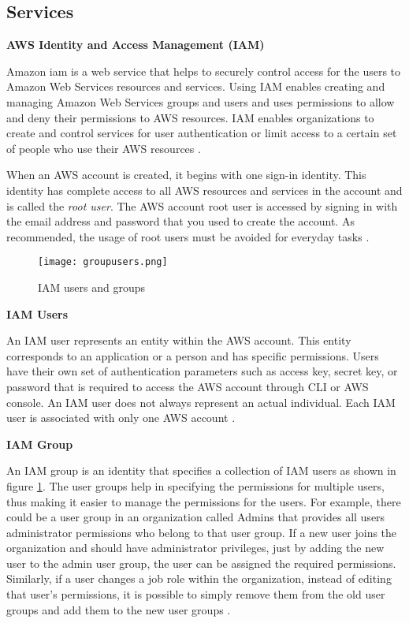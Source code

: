 \subsection{Services}

\textbf{AWS Identity and Access Management (IAM)}

\par Amazon \gls{iam} is a web service that helps to
securely
control access for the users to Amazon Web Services resources and services.
Using IAM enables creating and managing Amazon Web Services groups and users and uses permissions to allow and deny their permissions to AWS resources.
IAM enables organizations to create and control services
for user authentication or limit access to a certain set of people who use their AWS resources \cite{24}.


\par When an AWS account is created, it begins with one
sign-in identity.
This identity has
complete access to all AWS resources and services in the account and is called the \textit{root user}.
The AWS account root
user is accessed by signing in with the email address and password that you used to create the account.
As
recommended, the usage of root users must be avoided for
everyday tasks \cite{25}.


\begin{figure}
    \centering
    \texttt{[image: groupusers.png]}
    \caption{IAM users and groups}{\cite{26}}
    \label{fig:groupusers}
\end{figure}

\textbf{IAM Users}

\par An IAM user represents an entity within the AWS account.
This entity corresponds to an application or a person and has specific permissions.
Users have their own set of authentication parameters such as access key, secret key, or password that is required to access the AWS account through CLI or AWS console.
An IAM user does not always represent an actual individual.
Each IAM user is associated with only one AWS account
\cite{27}.
\hfill \break

\textbf{IAM Group}
\par An IAM group is an identity that specifies a 
collection of IAM users as shown in figure \ref{fig:groupusers}.
The user
groups help in specifying the permissions for multiple users, thus making it easier to manage the permissions for the users.
For example, there could be a user group in an organization called Admins that provides all users administrator permissions who belong to that user group.
If a new user joins the organization and should have administrator privileges, just by adding the new user to the admin user group, the user can be assigned the required permissions.
Similarly, if a user changes a job role within the organization, instead of editing that user’s permissions, it is possible to simply remove them from the old user groups and add them to the new user groups \cite{27}.
\hfill \break


